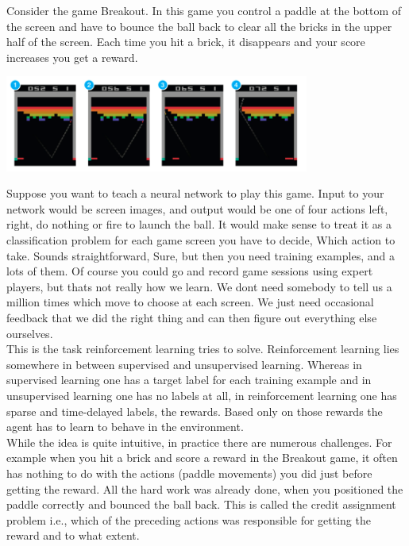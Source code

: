 \documentclass[twoside,letterpaper]{article}
\begin{document}
{\color{black}
Consider the game Breakout. In this game you control a paddle at the bottom of the screen and have to bounce the ball back to clear all the bricks in the upper half of the screen. Each time you hit a brick, it disappears and your score increases you get a reward.\\

\flushleft
\begin{centering}
\includegraphics[width=10cm]{images/breakout.png}\\
\end{centering}
\flushleft
Suppose you want to teach a neural network to play this game. Input to your network would be screen images, and output would be one of four actions left, right, do nothing or fire to launch the ball. It would make sense to treat it as a classification problem for each game screen you have to decide, Which action to take. Sounds straightforward, Sure, but then you need training examples, and a lots of them. Of course you could go and record game sessions using expert players, but thats not really how we learn. We dont need somebody to tell us a million times which move to choose at each screen. We just need occasional feedback that we did the right thing and can then figure out everything else ourselves.\\
\bigskip
This is the task reinforcement learning tries to solve. Reinforcement learning lies somewhere in between supervised and unsupervised learning. Whereas in supervised learning one has a target label for each training example and in unsupervised learning one has no labels at all, in reinforcement learning one has sparse and time-delayed labels, the rewards. Based only on those rewards the agent has to learn to behave in the environment.\\
\bigskip
While the idea is quite intuitive, in practice there are numerous challenges. For example when you hit a brick and score a reward in the Breakout game, it often has nothing to do with the actions (paddle movements) you did just before getting the reward. All the hard work was already done, when you positioned the paddle correctly and bounced the ball back. This is called the credit assignment problem i.e., which of the preceding actions was responsible for getting the reward and to what extent.\\
}
\end{document}
